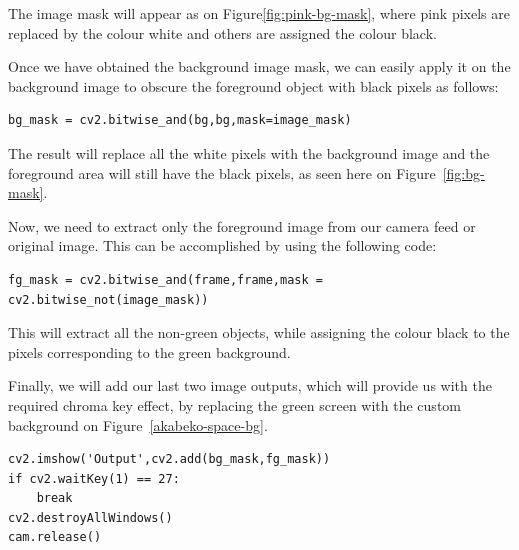 \documentclass{labo}
\begin{document}
The image mask will appear as on Figure\ref{fig:pink-bg-mask}, where pink pixels are replaced by the colour white and others are assigned the colour black.


Once we have obtained the background image mask, we can easily apply it on the background image to obscure the foreground object with black pixels as follows:
\begin{verbatim}
bg_mask = cv2.bitwise_and(bg,bg,mask=image_mask)
\end{verbatim}

The result will replace all the white pixels with the background image and the foreground area will still have the black pixels, as seen here on Figure~\ref{fig:bg-mask}.


Now, we need to extract only the foreground image from our camera feed or original image. This can be accomplished by using the following code:
\begin{verbatim}
fg_mask = cv2.bitwise_and(frame,frame,mask = cv2.bitwise_not(image_mask))
\end{verbatim}
This will extract all the non-green objects, while assigning the colour black to the pixels corresponding to the green background.

Finally, we will add our last two image outputs, which will provide us with the required chroma key effect, by replacing the green screen with the custom background on Figure~\ref{akabeko-space-bg}.
\begin{verbatim}
cv2.imshow('Output',cv2.add(bg_mask,fg_mask))
if cv2.waitKey(1) == 27:
	break
cv2.destroyAllWindows()
cam.release()
\end{verbatim}
\end{document}
